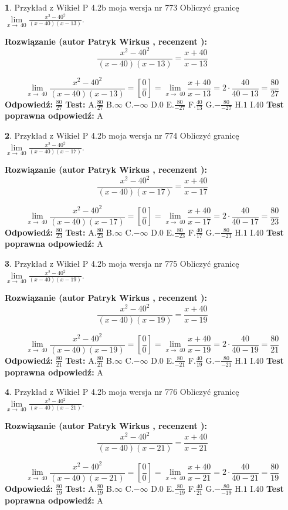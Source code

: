 \documentclass[12pt, a4paper]{article}
\theoremstyle{definition} %
\newtheorem{zad}{}
\newcommand{\zadStart}[1]{\begin{zad}#1\newline}
\newcommand{\zadStop}{\end{zad}}
\newcommand{\rozwStart}[2]{\noindent \textbf{Rozwiązanie (autor #1 , recenzent #2): }\newline}
\newcommand{\rozwStop}{\newline}
\newcommand{\odpStart}{\noindent \textbf{Odpowiedź:}\newline}
\newcommand{\odpStop}{\newline}
\newcommand{\testStart}{\noindent \textbf{Test:}\newline}
\newcommand{\testStop}{\newline}
\newcommand{\kluczStart}{\noindent \textbf{Test poprawna odpowiedź:}\newline}
\newcommand{\kluczStop}{\newline}
\begin{document}
\zadStart{Przykład z Wikieł P 4.2b moja wersja nr 773}
Obliczyć granicę $\lim\limits_{x\to\ 40}\frac{x^{2}-40^{2}}{(x-40)(x-13)}$.
\zadStop
\rozwStart{Patryk Wirkus}{}
$$\frac{x^{2}-40^{2}}{(x-40)(x-13)}=\frac{x+40}{x-13}$$

$$\lim\limits_{x\to\ 40}\frac{x^{2}-40^{2}}{(x-40)(x-13)}=[\frac{0}{0}]=\lim\limits_{x\to\ 40}\frac{x+40}{x-13}=2 \cdot \frac{40}{40-13} = \frac{80}{27}$$
\rozwStop
\odpStart
$\frac{80}{27}$
\odpStop
\testStart
A.$\frac{80}{27}$
B.$\infty$
C.$-\infty$
D.$0$
E.$\frac{80}{-27}$
F.$\frac{40}{13}$
G.$-\frac{80}{-27}$
H.$1$
I.$40$
\testStop
\kluczStart
A
\kluczStop



\zadStart{Przykład z Wikieł P 4.2b moja wersja nr 774}
Obliczyć granicę $\lim\limits_{x\to\ 40}\frac{x^{2}-40^{2}}{(x-40)(x-17)}$.
\zadStop
\rozwStart{Patryk Wirkus}{}
$$\frac{x^{2}-40^{2}}{(x-40)(x-17)}=\frac{x+40}{x-17}$$

$$\lim\limits_{x\to\ 40}\frac{x^{2}-40^{2}}{(x-40)(x-17)}=[\frac{0}{0}]=\lim\limits_{x\to\ 40}\frac{x+40}{x-17}=2 \cdot \frac{40}{40-17} = \frac{80}{23}$$
\rozwStop
\odpStart
$\frac{80}{23}$
\odpStop
\testStart
A.$\frac{80}{23}$
B.$\infty$
C.$-\infty$
D.$0$
E.$\frac{80}{-23}$
F.$\frac{40}{17}$
G.$-\frac{80}{-23}$
H.$1$
I.$40$
\testStop
\kluczStart
A
\kluczStop



\zadStart{Przykład z Wikieł P 4.2b moja wersja nr 775}
Obliczyć granicę $\lim\limits_{x\to\ 40}\frac{x^{2}-40^{2}}{(x-40)(x-19)}$.
\zadStop
\rozwStart{Patryk Wirkus}{}
$$\frac{x^{2}-40^{2}}{(x-40)(x-19)}=\frac{x+40}{x-19}$$

$$\lim\limits_{x\to\ 40}\frac{x^{2}-40^{2}}{(x-40)(x-19)}=[\frac{0}{0}]=\lim\limits_{x\to\ 40}\frac{x+40}{x-19}=2 \cdot \frac{40}{40-19} = \frac{80}{21}$$
\rozwStop
\odpStart
$\frac{80}{21}$
\odpStop
\testStart
A.$\frac{80}{21}$
B.$\infty$
C.$-\infty$
D.$0$
E.$\frac{80}{-21}$
F.$\frac{40}{19}$
G.$-\frac{80}{-21}$
H.$1$
I.$40$
\testStop
\kluczStart
A
\kluczStop



\zadStart{Przykład z Wikieł P 4.2b moja wersja nr 776}
Obliczyć granicę $\lim\limits_{x\to\ 40}\frac{x^{2}-40^{2}}{(x-40)(x-21)}$.
\zadStop
\rozwStart{Patryk Wirkus}{}
$$\frac{x^{2}-40^{2}}{(x-40)(x-21)}=\frac{x+40}{x-21}$$

$$\lim\limits_{x\to\ 40}\frac{x^{2}-40^{2}}{(x-40)(x-21)}=[\frac{0}{0}]=\lim\limits_{x\to\ 40}\frac{x+40}{x-21}=2 \cdot \frac{40}{40-21} = \frac{80}{19}$$
\rozwStop
\odpStart
$\frac{80}{19}$
\odpStop
\testStart
A.$\frac{80}{19}$
B.$\infty$
C.$-\infty$
D.$0$
E.$\frac{80}{-19}$
F.$\frac{40}{21}$
G.$-\frac{80}{-19}$
H.$1$
I.$40$
\testStop
\kluczStart
A
\kluczStop
\end{document}
